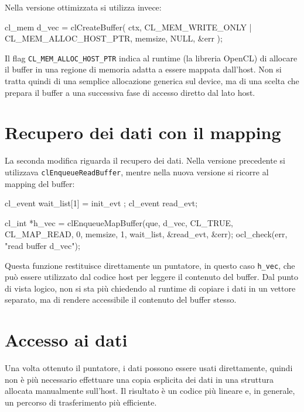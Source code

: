 Nella versione ottimizzata si utilizza invece:

\begin{code}[caption={Creazione del buffer con mapping}, label={code:buffer_map}]
cl_mem d_vec = clCreateBuffer(
  ctx,
  CL_MEM_WRITE_ONLY | CL_MEM_ALLOC_HOST_PTR,
  memsize,
  NULL,
  &err
);
\end{code}

Il flag \texttt{CL\_MEM\_ALLOC\_HOST\_PTR} indica al runtime (la libreria OpenCL) di allocare il buffer in una regione di memoria adatta a essere mappata dall’host. Non si tratta quindi di una semplice allocazione generica sul device, ma di una scelta che prepara il buffer a una successiva fase di accesso diretto dal lato host.

\section{Recupero dei dati con il mapping}

La seconda modifica riguarda il recupero dei dati. Nella versione precedente si utilizzava \texttt{clEnqueueReadBuffer}, mentre nella nuova versione si ricorre al mapping del buffer:

\begin{code}[caption={Mapping del buffer}, label={code:buffer_map_read}]
cl_event wait_list[1] = { init_evt };
cl_event read_evt;

cl_int *h_vec = clEnqueueMapBuffer(que, d_vec, CL_TRUE,
                  CL_MAP_READ, 0, memsize, 1, wait_list, &read_evt, &err);
ocl_check(err, "read buffer d_vec");
\end{code}

Questa funzione restituisce direttamente un puntatore, in questo caso \texttt{h\_vec}, che può essere utilizzato dal codice host per leggere il contenuto del buffer. Dal punto di vista logico, non si sta più chiedendo al runtime di copiare i dati in un vettore separato, ma di rendere accessibile il contenuto del buffer stesso.

\section{Accesso ai dati}

Una volta ottenuto il puntatore, i dati possono essere usati direttamente, quindi non è più necessario effettuare una copia esplicita dei dati in una struttura allocata manualmente sull’host. Il risultato è un codice più lineare e, in generale, un percorso di trasferimento più efficiente.

